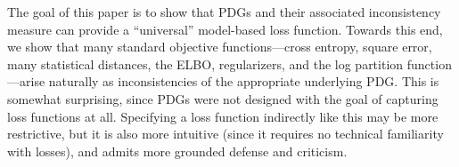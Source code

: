 \documentclass[twoside]{article}
\theoremstyle{plain}
\theoremstyle{definition}
\begin{document}
The goal of this paper is to show that PDGs and their associated inconsistency measure can provide a ``universal'' model-based loss function.
Towards this end, we show that many standard objective functions---cross
entropy, square error, many statistical distances, the ELBO,
regularizers, and the log partition
function---arise naturally as inconsistencies of the appropriate
underlying PDG.
This is somewhat surprising, since PDGs were not designed with the
goal of capturing loss functions at all.
Specifying a loss function indirectly like this may be more restrictive,
but it is also more intuitive
(since it requires no technical familiarity with losses),
%
and admits more grounded defense and criticism.
\end{document}
